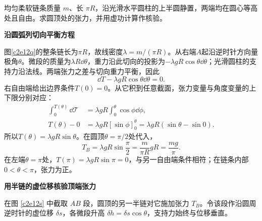 \begin{question}
\begin{example}[半圆链条的张力与虚功]
均匀柔软链条质量 $m$、长 $\pi R$，沿光滑水平圆柱的上半圆静置，两端均在圆心等高处且自由。求圆顶处的张力，并用虚功计算作核验。
\end{example}
\end{question}
\begin{solution}\textbf{沿圆弧列切向平衡方程}\par
图\ref{c2e12q}的整条链长为$\pi R$，故线密度$\lambda=m/(\pi R)$。从右端$A$起沿逆时针方向量极角$\theta$。微段的质量为$\lambda R\dd\theta$，重力沿此切向的投影为$-\lambda gR\cos\theta\dd\theta$；光滑圆柱的支持力沿法线。两端张力之差与切向重力平衡，因此
\[
\dd T-\lambda gR\cos\theta\dd\theta=0.
\]
右自由端给出边界条件$T(0)=0$。从它积到任意截面，张力变量与角度变量的上下限分别对应：
\begin{align*}
\int_0^{T(\theta)}\dd\mathcal T
&=\lambda gR\int_0^\theta\cos\phi\dd\phi,\\
T(\theta)-0
&=\lambda gR[\sin\phi]_0^\theta
=\lambda gR(\sin\theta-\sin0).
\end{align*}
所以$T(\theta)=\lambda gR\sin\theta$。在圆顶$\theta=\pi/2$处代入，
\[
T_B=\lambda gR\sin\frac\pi2
=\frac{m}{\pi R}gR=\boxed{\frac{mg}{\pi}}.
\]
在左端$\theta=\pi$处，$T(\pi)=\lambda gR\sin\pi=0$，与另一自由端条件相符；在链条内部$0<\theta<\pi$，张力为正。

\par\medskip{}\noindent\textbf{用半链的虚位移核验顶端张力}\par
在图 \ref{c2e12s} 中截取 $AB$ 段，圆顶的另一半链对它施加张力 $T_B$。令该段作沿圆周逆时针的虚位移 $\delta s$，各微段升高 $\delta h=\delta s\cos\theta$，支持力始终与位移垂直。


\end{solution}
